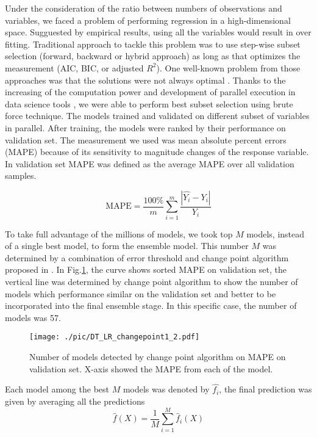 \documentclass{llncs}
\begin{document}
Under the consideration of the ratio between numbers of observations and variables, we faced a problem of performing regression in a high-dimensional space. Sugguested by empirical results, using all the variables would result in over fitting. Traditional approach to tackle this problem was to use step-wise subset selection (forward, backward or hybrid approach) as long as that optimizes the measurement (AIC, BIC, or adjusted $R^2$). One well-known problem from those approaches was that the solutions were not always optimal \cite{Yuan2006,Goodenough2012}. Thanks to the increasing of the computation power and development of parallel execution in data science tools \cite{Weston2015}, we were able to perform best subset selection using brute force technique. The models trained and validated on different subset of variables in parallel. After training, the models were ranked by their performance on validation set. The measurement we used was mean absolute percent errors (MAPE) because of its sensitivity to magnitude changes of the response variable. In validation set MAPE was defined as the average MAPE over all validation samples.

\begin{equation}
\mathrm{MAPE} = \frac{100\%}{m} \sum_{i=1}^{m} \frac{|\hat{Y_i} - Y_i|}{Y_i}
\label{eq:vs1}
\end{equation}

To take full advantage of the millions of models, we took top $M$ models, instead of a single best model, to form the ensemble model. This number $M$ was determined by a combination of error threshold and change point algorithm proposed in \cite{Killick2014}.  In Fig.\ref{fig:change_point}, the curve shows sorted MAPE on validation set, the vertical line was determined by change point algorithm to show the number of models which performance similar on the validation set and better to be incorporated into the final ensemble stage. In this specific case, the number of models was 57.
\begin{figure}[ht]
\centering 
   \texttt{[image: ./pic/DT\_LR\_changepoint1\_2.pdf]}
    \caption{Number of models detected by change point algorithm on MAPE on validation set. X-axis showed the MAPE from each of the model.}
    \label{fig:change_point}
\end{figure}



Each model among the best $M$ models was denoted by $\hat{f_i}$, the final prediction was given by averaging all the predictions 
\begin{equation}
\hat{f}(X) = \frac{1}{M}\sum_{i=1}^{M}\hat{f}_{i}(X)
\label{eq:vs2}
\end{equation}
\end{document}
